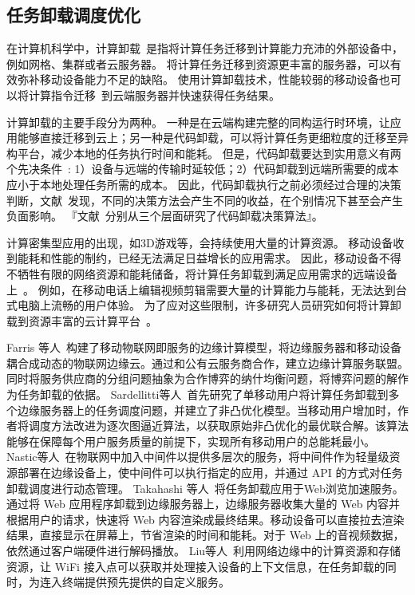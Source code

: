\subsection{任务卸载调度优化}

在计算机科学中，计算卸载~\cite{DBLP:journals/network/MaZZWP13}是指将计算任务迁移到计算能力充沛的外部设备中，例如网格、集群或者云服务器。
将计算任务迁移到资源更丰富的服务器，可以有效弥补移动设备能力不足的缺陷。
使用计算卸载技术，性能较弱的移动设备也可以将计算指令迁移~\cite{DBLP:journals/monet/KumarLLB13}到云端服务器并快速获得任务结果。

计算卸载的主要手段分为两种。
一种是在云端构建完整的同构运行时环境，让应用能够直接迁移到云上；另一种是代码卸载，可以将计算任务更细粒度的迁移至异构平台，减少本地的任务执行时间和能耗。
但是，代码卸载要达到实用意义有两个先决条件~\cite{Flores:2017bv}: 1）设备与远端的传输时延较低；2）代码卸载到远端所需要的成本应小于本地处理任务所需的成本。
因此，代码卸载执行之前必须经过合理的决策判断，文献~\cite{Kosta:2012cj}发现，不同的决策方法会产生不同的收益，在个别情况下甚至会产生负面影响。
『文献~\cite{Chen:2016bd,Baier:2012hb,Han:2012dl}分别从三个层面研究了代码卸载决策算法』。

计算密集型应用的出现，如3D游戏等，会持续使用大量的计算资源。
移动设备收到能耗和性能的制约，已经无法满足日益增长的应用需求。
因此，移动设备不得不牺牲有限的网络资源和能耗储备，将计算任务卸载到满足应用需求的远端设备上~\cite{DBLP:conf/ispa/KovachevYK12}。
例如，在移动电话上编辑视频剪辑需要大量的计算能力与能耗，无法达到台式电脑上流畅的用户体验。
为了应对这些限制，许多研究人员研究如何将计算卸载到资源丰富的云计算平台~\cite{DBLP:conf/secon/HassanXWC15,DBLP:journals/pervasive/SatyanarayananBCD09,DBLP:journals/computer/KumarL10}。

Farris 等人~\cite{DBLP:journals/fgcs/FarrisMNAI17}构建了移动物联网即服务的边缘计算模型，将边缘服务器和移动设备耦合成动态的物联网边缘云。通过和公有云服务商合作，建立边缘计算服务联盟。同时将服务供应商的分组问题抽象为合作博弈的纳什均衡问题，将博弈问题的解作为任务卸载的依据。
Sardellitti等人~\cite{DBLP:journals/tsipn/SardellittiSB15}首先研究了单移动用户将计算任务卸载到多个边缘服务器上的任务调度问题，并建立了非凸优化模型。当移动用户增加时，作者将调度方法改进为逐次图逼近算法，以获取原始非凸优化的最优联合解。该算法能够在保障每个用户服务质量的前提下，实现所有移动用户的总能耗最小。
Nastic等人~\cite{DBLP:conf/edge/NasticTD16}在物联网中加入中间件以提供多层次的服务，将中间件作为轻量级资源部署在边缘设备上，使中间件可以执行指定的应用，并通过 API 的方式对任务卸载调度进行动态管理。
Takahashi 等人~\cite{DBLP:conf/mobilecloud/TakahashiTK15}将任务卸载应用于Web浏览加速服务。通过将 Web 应用程序卸载到边缘服务器上，边缘服务器收集大量的 Web 内容并根据用户的请求，快速将 Web 内容渲染成最终结果。移动设备可以直接拉去渲染结果，直接显示在屏幕上，节省渲染的时间和能耗。对于 Web 上的音视频数据，依然通过客户端硬件进行解码播放。
Liu等人~\cite{DBLP:conf/edge/LiuWB16}利用网络边缘中的计算资源和存储资源，让 WiFi 接入点可以获取并处理接入设备的上下文信息，在任务卸载的同时，为连入终端提供预先提供的自定义服务。

